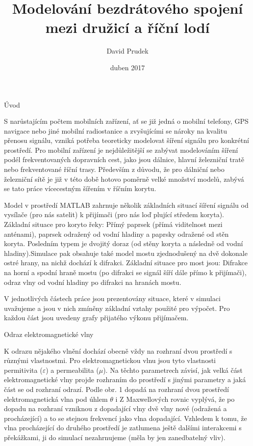  
 
 
 \worktype [B/CZ]
 \title {Modelování bezdrátového spojení mezi družicí a říční lodí}
 \author {David Prudek}
 \date {duben 2017}
 
 \makefront
 
 \def\frac#1#2{{\begingroup#1\endgroup\over#2}} %

 \chap Úvod
 
 
 S narůstajícím počtem mobilních zařízení, ať se již jedná o mobilní
telefony, GPS navigace nebo jiné mobilní radiostanice a zvyšujícími se nároky
na kvalitu přenosu signálu, vzniká potřeba teoreticky modelovat šíření signálu
pro konkrétní prostředí. Pro mobilní zařízení je nejdůležitější se zabývat
modelováním šíření podél frekventovaných dopravních cest, jako jsou dálnice,
hlavní železniční tratě nebo frekventované říční trasy.
	Především z důvodu, že pro dálniční nebo železniční sítě je již v této době
hotovo poměrně velké množství modelů, zabývá se tato práce vícecestným
šířením v říčním korytu.

	Model v prostředí MATLAB zahrnuje několik základních situací šíření
signálu od vysílače (pro nás satelit) k přijímači (pro nás loď plující středem
koryta). Základní situace pro koryto řeky: Přímý paprsek (přímá viditelnost mezi
anténami), paprsek odražený od vodní hladiny a paprsky odražené od stěn
koryta. Posledním typem je dvojitý doraz (od stěny koryta a následně od vodní
hladiny).Simulace pak obsahuje také model mostu zjednodušený na dvě
dokonale ostré hrany, na nichž dochází k difrakci. Základní situace pro most
jsou: Difrakce na horní a spodní hraně mostu (po difrakci se signál šíří dále
přímo k přijímači), odraz vlny od vodní hladiny po difrakci na hranách mostu.

	V jednotlivých částech práce jsou prezentovány situace, které v simulaci
uvažujeme a jsou v nich zmíněny základní vztahy použité pro výpočet.
Pro každou část jsou uvedeny grafy přijatého výkonu přijímačem.
 
 
 \chap Odraz elektromagnetické vlny

K odrazu nějakého vlnění dochází obecně vždy na rozhraní dvou
prostředí s různými vlastnostmi. Pro elektromagnetickou vlnu jsou tyto
vlastnosti permitivita ($\varepsilon$) a permeabilita ($\mu$). Na těchto parametrech závisí, jak
velká část elektromagnetické vlny projde rozhraním do prostředí s jinými
parametry a jaká část se od rozhraní odrazí. Podle obr. 1 dopadá na rozhraní
dvou prostředí elektromagnetická vlna pod úhlem $\theta$ i Z Maxwellových rovnic
vyplývá, že po dopadu na rozhraní vzniknou z dopadající vlny dvě vlny nové
(odražená a procházející) a to se stejnou frekvencí jako vlna dopadající.
Vzhledem k tomu, že vlna procházející do druhého prostředí je zatlumena
ještě dalšími interakcemi s překážkami, ji do simulací nezahrnujeme (měla by
jen zanedbatelný vliv).
 
